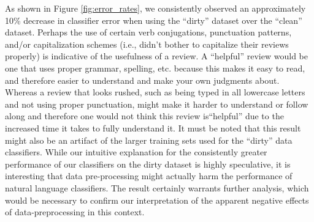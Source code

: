 As shown in Figure \ref{fig:error_rates}, we consistently observed an approximately 10\% decrease in classifier error when using the ``dirty'' dataset over the ``clean'' dataset.
Perhaps the use of certain verb conjugations, punctuation patterns, and/or capitalization schemes (i.e., didn't bother to capitalize their reviews properly) is indicative of the usefulness of a review. 
A ``helpful'' review would be one that uses proper grammar, spelling, etc. because this makes it easy to read, and therefore easier to understand and make your own judgments about. Whereas a review that looks rushed, such as being typed in all lowercase letters and not using proper punctuation,  might make it harder to understand or follow along and therefore one would not think this review is``helpful'' due to the increased time it takes to fully understand it.
It must be noted that this result might also be an artifact of the larger training sets used for the ``dirty'' data classifiers. 
While our intuitive explanation for the consistently greater performance of our classifiers on the dirty dataset is highly speculative, it is interesting that data pre-processing might actually harm the performance of natural language classifiers.
The result certainly warrants further analysis, which would be necessary to confirm our interpretation of the apparent negative effects of data-preprocessing in this context.
